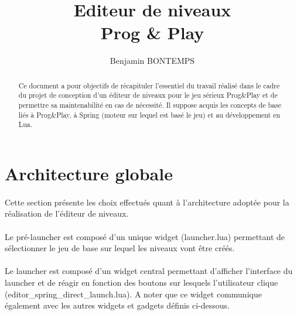 \documentclass[a4paper]{article}
\title{Editeur de niveaux\\Prog \& Play}
\author{Benjamin BONTEMPS}
\begin{document}
\maketitle

\begin{abstract}
Ce document a pour objectifs de récapituler l'essentiel du travail réalisé dans le cadre du projet de conception d'un éditeur de niveaux pour le jeu sérieux Prog\&Play et de permettre sa maintenabilité en cas de nécessité. Il suppose acquis les concepts de base liés à Prog\&Play, à Spring (moteur sur lequel est basé le jeu) et au développement en Lua.
\end{abstract}

\tableofcontents

\newpage

\section{Architecture globale}
\paragraph{}
Cette section présente les choix effectués quant à l'architecture adoptée pour la réalisation de l'éditeur de niveaux.
\paragraph{}
Le pré-launcher est composé d'un unique widget (launcher.lua) permettant de sélectionner le jeu de base sur lequel les niveaux vont être créés.
\paragraph{}
Le launcher est composé d'un widget central permettant d'afficher l'interface du launcher et de réagir en fonction des boutons sur lesquels l'utilisateur clique (editor\_spring\_direct\_launch.lua). A noter que ce widget communique également avec les autres widgets et gadgets définis ci-dessous.
\end{document}

